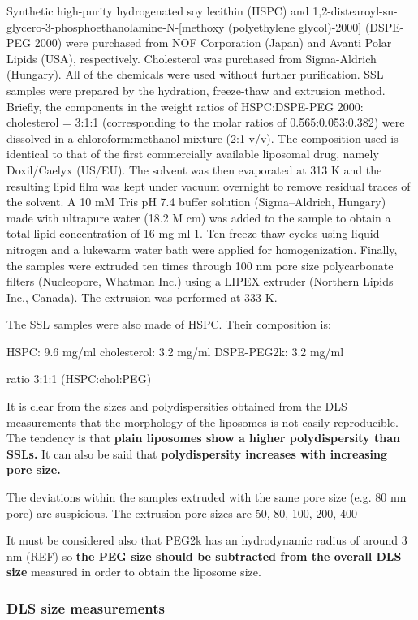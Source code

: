 Synthetic high-purity hydrogenated soy lecithin (HSPC) and 1,2-distearoyl-sn-glycero-3-phosphoethanolamine-N-[methoxy (polyethylene glycol)-2000] (DSPE-PEG 2000) were purchased from NOF Corporation (Japan) and Avanti Polar Lipids (USA), respectively. Cholesterol was purchased from Sigma-Aldrich (Hungary). All of the chemicals were used without further purification. SSL samples were prepared by the hydration, freeze-thaw and extrusion method. Briefly, the components in the weight ratios of HSPC:DSPE-PEG 2000: cholesterol = 3:1:1 (corresponding to the molar ratios of 0.565:0.053:0.382) were dissolved in a chloroform:methanol mixture (2:1 v/v). The composition used is identical to that of the first commercially available liposomal drug, namely Doxil/Caelyx (US/EU). The solvent was then evaporated at 313 K and the resulting lipid film was kept under vacuum overnight to remove residual traces of the solvent. A 10 mM Tris pH 7.4 buffer solution (Sigma–Aldrich, Hungary) made with ultrapure water (18.2 M  cm) was added to the sample to obtain a total lipid concentration of 16 mg ml-1. Ten freeze-thaw cycles using liquid nitrogen and a lukewarm water bath were applied for homogenization. Finally, the samples were extruded ten times through 100 nm pore size polycarbonate filters (Nucleopore, Whatman Inc.) using a LIPEX extruder (Northern Lipids Inc., Canada). The extrusion was performed at 333 K.

The SSL samples were also made of HSPC. Their composition is:

HSPC: 9.6 mg/ml
cholesterol: 3.2 mg/ml
DSPE-PEG2k: 3.2 mg/ml

ratio 3:1:1 (HSPC:chol:PEG)

It is clear from the sizes and polydispersities obtained from the DLS measurements that the morphology of the liposomes is not easily reproducible. The tendency is that \textbf{plain liposomes show a higher polydispersity than SSLs.} It can also be said that \textbf{polydispersity increases with increasing pore size.} 

The deviations within the samples extruded with the same pore size (e.g. 80 nm pore) are suspicious. The extrusion pore sizes are 50, 80, 100, 200, 400

It must be considered also that PEG2k has an hydrodynamic radius of around 3 nm (REF) so \textbf{the PEG size should be subtracted from the overall DLS size} measured in order to obtain the liposome size.


\subsubsection{DLS size measurements}

